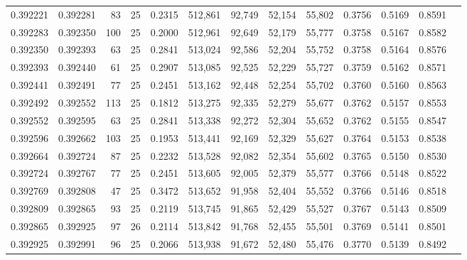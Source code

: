 \begin{tabular}{rrrrrrrrrrrrr}
0.392221 & 0.392281 &    83 &  25 &                                     0.2315 & 512,861 &  92,749 &  52,154 &  55,802 & 0.3756 & 0.5169 & 0.8591 \\
0.392283 & 0.392350 &   100 &  25 &                                     0.2000 & 512,961 &  92,649 &  52,179 &  55,777 & 0.3758 & 0.5167 & 0.8582 \\
0.392350 & 0.392393 &    63 &  25 &                                     0.2841 & 513,024 &  92,586 &  52,204 &  55,752 & 0.3758 & 0.5164 & 0.8576 \\
0.392393 & 0.392440 &    61 &  25 &                                     0.2907 & 513,085 &  92,525 &  52,229 &  55,727 & 0.3759 & 0.5162 & 0.8571 \\
0.392441 & 0.392491 &    77 &  25 &                                     0.2451 & 513,162 &  92,448 &  52,254 &  55,702 & 0.3760 & 0.5160 & 0.8563 \\
0.392492 & 0.392552 &   113 &  25 &                                     0.1812 & 513,275 &  92,335 &  52,279 &  55,677 & 0.3762 & 0.5157 & 0.8553 \\
0.392552 & 0.392595 &    63 &  25 &                                     0.2841 & 513,338 &  92,272 &  52,304 &  55,652 & 0.3762 & 0.5155 & 0.8547 \\
0.392596 & 0.392662 &   103 &  25 &                                     0.1953 & 513,441 &  92,169 &  52,329 &  55,627 & 0.3764 & 0.5153 & 0.8538 \\
0.392664 & 0.392724 &    87 &  25 &                                     0.2232 & 513,528 &  92,082 &  52,354 &  55,602 & 0.3765 & 0.5150 & 0.8530 \\
0.392724 & 0.392767 &    77 &  25 &                                     0.2451 & 513,605 &  92,005 &  52,379 &  55,577 & 0.3766 & 0.5148 & 0.8522 \\
0.392769 & 0.392808 &    47 &  25 &                                     0.3472 & 513,652 &  91,958 &  52,404 &  55,552 & 0.3766 & 0.5146 & 0.8518 \\
0.392809 & 0.392865 &    93 &  25 &                                     0.2119 & 513,745 &  91,865 &  52,429 &  55,527 & 0.3767 & 0.5143 & 0.8509 \\
0.392865 & 0.392925 &    97 &  26 &                                     0.2114 & 513,842 &  91,768 &  52,455 &  55,501 & 0.3769 & 0.5141 & 0.8501 \\
0.392925 & 0.392991 &    96 &  25 &                                     0.2066 & 513,938 &  91,672 &  52,480 &  55,476 & 0.3770 & 0.5139 & 0.8492 \\

\end{tabular}
